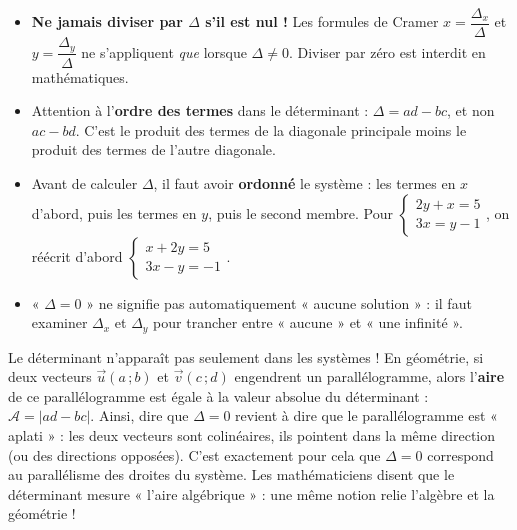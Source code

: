 \documentclass[11pt]{article}
\begin{document}
\begin{attention}
\begin{itemize}
\item \textbf{Ne jamais diviser par $\Delta$ s'il est nul !} Les formules de Cramer $x = \dfrac{\Delta_x}{\Delta}$ et $y = \dfrac{\Delta_y}{\Delta}$ ne s'appliquent \emph{que} lorsque $\Delta \neq 0$. Diviser par zéro est interdit en mathématiques.
\item Attention à l'\textbf{ordre des termes} dans le déterminant : $\Delta = ad - bc$, et non $ac - bd$. C'est le produit des termes de la diagonale principale moins le produit des termes de l'autre diagonale.
\item Avant de calculer $\Delta$, il faut avoir \textbf{ordonné} le système : les termes en $x$ d'abord, puis les termes en $y$, puis le second membre. Pour $\begin{cases} 2y + x = 5 \\ 3x = y - 1 \end{cases}$, on réécrit d'abord $\begin{cases} x + 2y = 5 \\ 3x - y = -1 \end{cases}$.
\item « $\Delta = 0$ » ne signifie pas automatiquement « aucune solution » : il faut examiner $\Delta_x$ et $\Delta_y$ pour trancher entre « aucune » et « une infinité ».
\end{itemize}
\end{attention}

\begin{savaistu}
Le déterminant n'apparaît pas seulement dans les systèmes ! En géométrie, si deux vecteurs $\vec{u}(a\,;b)$ et $\vec{v}(c\,;d)$ engendrent un parallélogramme, alors l'\textbf{aire} de ce parallélogramme est égale à la valeur absolue du déterminant : $\mathcal{A} = |ad - bc|$. Ainsi, dire que $\Delta = 0$ revient à dire que le parallélogramme est « aplati » : les deux vecteurs sont colinéaires, ils pointent dans la même direction (ou des directions opposées). C'est exactement pour cela que $\Delta = 0$ correspond au parallélisme des droites du système. Les mathématiciens disent que le déterminant mesure « l'aire algébrique » : une même notion relie l'algèbre et la géométrie !
\end{savaistu}
\end{document}
